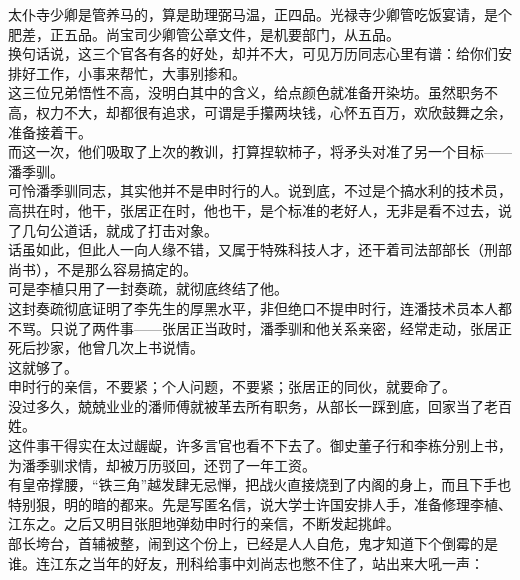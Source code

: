 \begin{multicols}{\theparacolNo}
太仆寺少卿是管养马的，算是助理弼马温，正四品。光禄寺少卿管吃饭宴请，是个肥差，正五品。尚宝司少卿管公章文件，是机要部门，从五品。\\

换句话说，这三个官各有各的好处，却并不大，可见万历同志心里有谱：给你们安排好工作，小事来帮忙，大事别掺和。\\

这三位兄弟悟性不高，没明白其中的含义，给点颜色就准备开染坊。虽然职务不高，权力不大，却都很有追求，可谓是手攥两块钱，心怀五百万，欢欣鼓舞之余，准备接着干。\\

而这一次，他们吸取了上次的教训，打算捏软柿子，将矛头对准了另一个目标——潘季驯。\\

可怜潘季驯同志，其实他并不是申时行的人。说到底，不过是个搞水利的技术员，高拱在时，他干，张居正在时，他也干，是个标准的老好人，无非是看不过去，说了几句公道话，就成了打击对象。\\

话虽如此，但此人一向人缘不错，又属于特殊科技人才，还干着司法部部长（刑部尚书），不是那么容易搞定的。\\

可是李植只用了一封奏疏，就彻底终结了他。\\

这封奏疏彻底证明了李先生的厚黑水平，非但绝口不提申时行，连潘技术员本人都不骂。只说了两件事——张居正当政时，潘季驯和他关系亲密，经常走动，张居正死后抄家，他曾几次上书说情。\\

这就够了。\\

申时行的亲信，不要紧；个人问题，不要紧；张居正的同伙，就要命了。\\

没过多久，兢兢业业的潘师傅就被革去所有职务，从部长一踩到底，回家当了老百姓。\\

这件事干得实在太过龌龊，许多言官也看不下去了。御史董子行和李栋分别上书，为潘季驯求情，却被万历驳回，还罚了一年工资。\\

有皇帝撑腰，“铁三角”越发肆无忌惮，把战火直接烧到了内阁的身上，而且下手也特别狠，明的暗的都来。先是写匿名信，说大学士许国安排人手，准备修理李植、江东之。之后又明目张胆地弹劾申时行的亲信，不断发起挑衅。\\

部长垮台，首辅被整，闹到这个份上，已经是人人自危，鬼才知道下个倒霉的是谁。连江东之当年的好友，刑科给事中刘尚志也憋不住了，站出来大吼一声：\\


\end{multicols}
